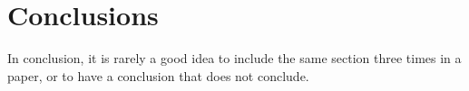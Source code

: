 



\section{Conclusions}

In conclusion, it is rarely a good idea to include the same section three times in a paper, or to have a conclusion that does not conclude.

\appendix



%

